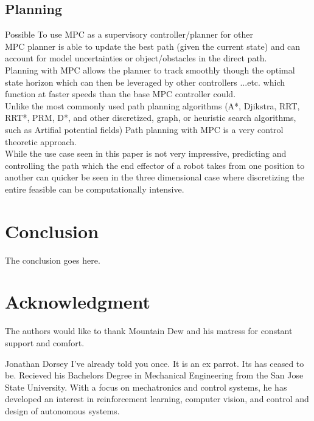 \documentclass[journal]{IEEEtran}
\begin{document}
\subsection{Planning}

Possible To use MPC as a supervisory controller/planner for other\\

MPC planner is able to update the best path (given the current state) and can account for model uncertainties or object/obstacles in the direct path.\\

Planning with MPC allows the planner to track smoothly though the optimal state horizon which can then be leveraged by other controllers ...etc. which function at faster speeds than the base MPC controller could.\\

Unlike the most commonly used path planning algorithms (A*, Djikstra, RRT, RRT*, PRM, D*, and other discretized, graph, or heuristic search algorithms, such as Artifial potential fields) Path planning with MPC is a very control theoretic approach.\\

While the use case seen in this paper is not very impressive, predicting and controlling the path which the end effector of a robot takes from one position to another can quicker be seen in the three dimensional case where discretizing the entire feasible can be computationally intensive.\\





\section{Conclusion}
The conclusion goes here.


\section*{Acknowledgment}


The authors would like to thank Mountain Dew and his matress for constant support and comfort.



\ifCLASSOPTIONcaptionsoff
  \newpage
\fi

\cite{craig_introduction_2005}
\cite{khalil_nonlinear_2002}
\cite{rawlings_model_2017}
\cite{armstrong_explicit_1986}
\cite{ogata_modern_2010}
\cite{meriam_engineering_1993}
\cite{greenwood_advanced_2006}
\cite{borrelli_predictive_2017}
\cite{boyd_convex_2004}
\cite{slotine_applied_1991}


\begin{IEEEbiography}{Jonathan Dorsey}
  I've already told you once. It is an ex parrot. Its has ceased to be. Recieved his Bachelors Degree in Mechanical Engineering from the San Jose State University. With a focus on mechatronics and control systems, he has developed an interest in reinforcement learning, computer vision, and control and design of autonomous systems.
\end{IEEEbiography}
\end{document}

